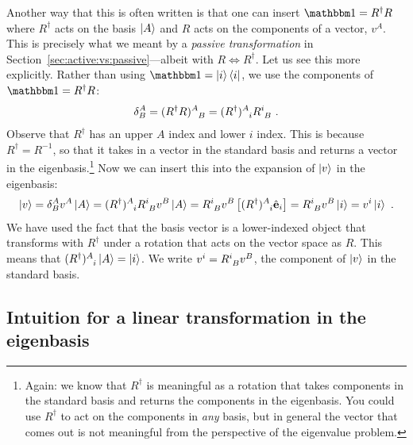 \documentclass[12pt]{article}
\begin{document}
Another way that this is often written is that one can insert $\one = R^\dag R$ where $R^\dag$ acts on the basis $\left|A\right\rangle$ and $R$ acts on the components of a vector, $v^A$. This is precisely what we meant by a \emph{passive transformation} in Section~\ref{sec:active:vs:passive}---albeit with $R\Leftrightarrow R^\dag$. Let us see this more explicitly. Rather than using $\one = \ket{i}\bra{i}$, we use the components of $\one = R^\dag R$:
\begin{align}
    \delta^A_B = (R^\dag R)\aij{A}{B} = 
    (R^\dag)\aij{A}{i}R\aij{i}{B} \ .
\end{align}
Observe that $R^\dag$ has an upper $A$ index and lower $i$ index. This is because $R^\dag = R^{-1}$, so that it takes in a vector in the standard basis and returns a vector in the eigenbasis.\footnote{Again: we know that $R^\dag$ is meaningful as a rotation that takes components in the standard basis and returns the components in the eigenbasis. You could use $R^\dag$ to act on the components in \emph{any} basis, but in general the vector that comes out is not meaningful from the perspective of the eigenvalue problem.} Now we can insert this into the expansion of $\left|v\right\rangle$ in the eigenbasis:
\begin{align}
    \ket{v} = \delta^A_B v^A\ket{A} 
    = (R^\dag)\aij{A}{i} R\aij{i}{B} v^B \ket{A}
    = R\aij{i}B{v}^B \left[(R^\dag)\aij{A}{i}\bas{e}_i\right]
    = R\aij{i}B{v}^B \ket{i}
    = v^i \ket{i}  \ .
\end{align}
We have used the fact that the basis vector is a lower-indexed object that transforms with $R^\dag$ under a rotation that acts on the vector space as $R$. This means that $(R^\dag)\aij{A}{i}\ket{A} = \ket{i}$. We write $v^i = R\aij{i}{B} v^B$, the component of $\left|v\right\rangle$ in the standard basis. 






\subsection{Intuition for a linear transformation in the eigenbasis}
\end{document}
